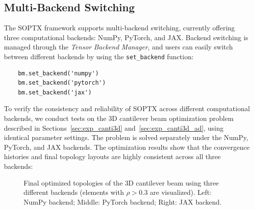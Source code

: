 \documentclass[mathpazo]{cicp}
\begin{document}
\subsection{Multi-Backend Switching}\label{sec:exp_multi_backend}
The SOPTX framework supports multi-backend switching, currently offering three computational backends: NumPy, PyTorch, and JAX. Backend switching is managed through the \textit{Tensor Backend Manager}, and users can easily switch between different backends by using the \texttt{set\_backend} function:
\begin{lstlisting}
	bm.set_backend('numpy')    
	bm.set_backend('pytorch') 
	bm.set_backend('jax')     
\end{lstlisting}

To verify the consistency and reliability of SOPTX across different computational backends, we conduct tests on the 3D cantilever beam optimization problem described in Sections~\ref{sec:exp_canti3d} and~\ref{sec:exp_canti3d_ad}, using identical parameter settings. The problem is solved separately under the NumPy, PyTorch, and JAX backends. The optimization results show that the convergence histories and final topology layouts are highly consistent across all three backends:

\begin{figure}[htp]
	\centering
	\caption{Final optimized topologies of the 3D cantilever beam using three different backends (elements with $\rho>0.3$ are visualized). Left: NumPy backend; Middle: PyTorch backend; Right: JAX backend.}
	\label{fig:canti3d_backend_compare}
\end{figure}
\end{document}
